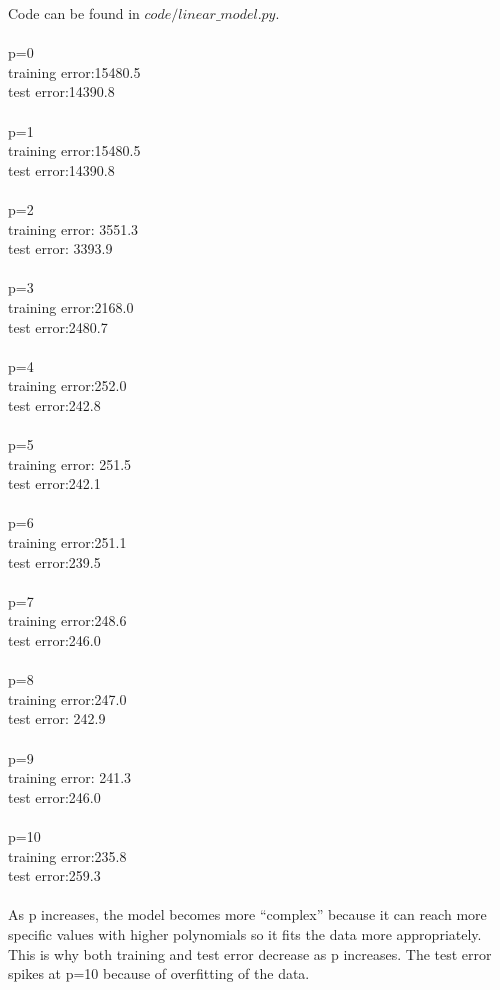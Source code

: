 \documentclass{article}
\begin{document}
Code can be found in $code/linear\_model.py$. \\\\
p=0 \\
training error:15480.5 \\
test error:14390.8 \\\\
p=1 \\
training error:15480.5 \\
test error:14390.8 \\\\
p=2 \\
training error: 3551.3 \\
test error: 3393.9 \\\\
p=3 \\
training error:2168.0\\
test error:2480.7\\\\
p=4\\
training error:252.0\\
test error:242.8\\\\
p=5\\
training error: 251.5\\
test error:242.1\\\\
p=6\\
training error:251.1\\
test error:239.5\\\\
p=7\\
training error:248.6\\
test error:246.0\\\\
p=8\\
training error:247.0\\
test error: 242.9\\\\
p=9\\
training error: 241.3\\
test error:246.0\\\\
p=10\\
training error:235.8\\
test error:259.3\\\\

As p increases, the model becomes more “complex” because it can reach more specific values with higher polynomials so it fits the data more appropriately. This is why both training and test error decrease as p increases. The test error spikes at p=10 because of overfitting of the data.
\end{document}
